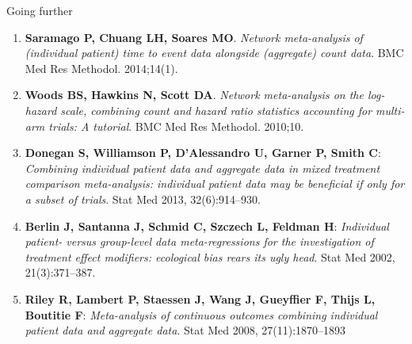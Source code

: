 \documentclass[
  ignorenonframetext,
]{beamer}
\begin{document}
\begin{frame}{Going further}
\protect\hypertarget{going-further}{}
\begin{tcolorbox}[enhanced jigsaw, toprule=.15mm, titlerule=0mm, colback=white, arc=.35mm, opacitybacktitle=0.6, coltitle=black, title={References}, breakable, toptitle=1mm, leftrule=.75mm, bottomtitle=1mm, rightrule=.15mm, opacityback=0, colframe=quarto-callout-note-color-frame, colbacktitle=quarto-callout-note-color!10!white, left=2mm, bottomrule=.15mm]

\begin{enumerate}
\item
  \textbf{Saramago P, Chuang LH, Soares MO}. \emph{Network meta-analysis
  of (individual patient) time to event data alongside (aggregate) count
  data}. BMC Med Res Methodol. 2014;14(1).
\item
  \textbf{Woods BS, Hawkins N, Scott DA}. \emph{Network meta-analysis on
  the log-hazard scale, combining count and hazard ratio statistics
  accounting for multi-arm trials: A tutorial}. BMC Med Res Methodol.
  2010;10.
\item
  \textbf{Donegan S, Williamson P, D'Alessandro U, Garner P, Smith C}:
  \emph{Combining individual patient data and aggregate data in mixed
  treatment comparison meta-analysis: individual patient data may be
  beneficial if only for a subset of trials}. Stat Med 2013,
  32(6):914--930.
\item
  \textbf{Berlin J, Santanna J, Schmid C, Szczech L, Feldman H}:
  \emph{Individual patient- versus group-level data meta-regressions for
  the investigation of treatment effect modifiers: ecological bias rears
  its ugly head}. Stat Med 2002, 21(3):371--387.
\item
  \textbf{Riley R, Lambert P, Staessen J, Wang J, Gueyffier F, Thijs L,
  Boutitie F}: \emph{Meta-analysis of continuous outcomes combining
  individual patient data and aggregate data}. Stat Med 2008,
  27(11):1870--1893
\end{enumerate}

\end{tcolorbox}
\end{frame}
\end{document}
